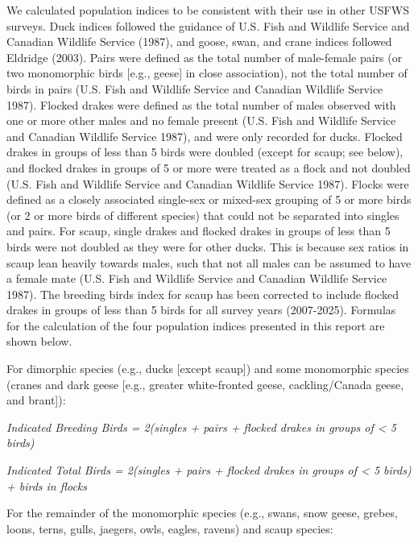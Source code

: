 \documentclass[
]{article}
\begin{document}
We calculated population indices to be consistent with their use in
other USFWS surveys. Duck indices followed the guidance of U.S. Fish and
Wildlife Service and Canadian Wildlife Service (1987), and goose, swan,
and crane indices followed Eldridge (2003). Pairs were defined as the
total number of male-female pairs (or two monomorphic birds {[}e.g.,
geese{]} in close association), not the total number of birds in pairs
(U.S. Fish and Wildlife Service and Canadian Wildlife Service 1987).
Flocked drakes were defined as the total number of males observed with
one or more other males and no female present (U.S. Fish and Wildlife
Service and Canadian Wildlife Service 1987), and were only recorded for
ducks. Flocked drakes in groups of less than 5 birds were doubled
(except for scaup; see below), and flocked drakes in groups of 5 or more
were treated as a flock and not doubled (U.S. Fish and Wildlife Service
and Canadian Wildlife Service 1987). Flocks were defined as a closely
associated single-sex or mixed-sex grouping of 5 or more birds (or 2 or
more birds of different species) that could not be separated into
singles and pairs. For scaup, single drakes and flocked drakes in groups
of less than 5 birds were not doubled as they were for other ducks. This
is because sex ratios in scaup lean heavily towards males, such that not
all males can be assumed to have a female mate (U.S. Fish and Wildlife
Service and Canadian Wildlife Service 1987). The breeding birds index
for scaup has been corrected to include flocked drakes in groups of less
than 5 birds for all survey years (2007-2025). Formulas for the
calculation of the four population indices presented in this report are
shown below.

For dimorphic species (e.g., ducks {[}except scaup{]}) and some
monomorphic species (cranes and dark geese {[}e.g., greater
white-fronted geese, cackling/Canada geese, and brant{]}):

\begin{center}

\textit{Indicated Breeding Birds = 2(singles + pairs + flocked drakes in groups of < 5 birds)} \newline

\textit{Indicated Total Birds = 2(singles + pairs + flocked drakes in groups of < 5 birds) + birds in flocks} \newline

\end{center}

For the remainder of the monomorphic species (e.g., swans, snow geese, grebes, loons, terns, gulls, jaegers, owls, eagles, ravens) and scaup species:\newline
\end{document}
